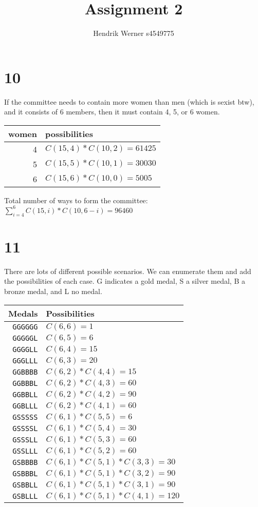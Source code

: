 \documentclass[12pt]{article}
\title{Assignment 2}
\author{
	Hendrik Werner s4549775
}
\begin{document}
\maketitle

\section*{10}
If the committee needs to contain more women than men (which is sexist btw), and it consists of 6 members, then it must contain 4, 5, or 6 women.

\begin{tabular}{r|l}
	women & possibilities\\\hline
	4 & $C(15, 4) * C(10, 2) = 61425$\\
	5 & $C(15, 5) * C(10, 1) = 30030$\\
	6 & $C(15, 6) * C(10, 0) = 5005$
\end{tabular}

Total number of ways to form the committee: $\sum_{i=4}^{6} C(15, i) * C(10, 6 - i) = 96460$

\section*{11}
There are lots of different possible scenarios. We can enumerate them and add the possibilities of each case. G indicates a gold medal, S a silver medal, B a bronze medal, and L no medal.

\begin{tabular}{r|l}
	Medals & Possibilities\\\hline
	\texttt{GGGGGG} & $C(6, 6) = 1$\\
	\texttt{GGGGGL} & $C(6, 5) = 6$\\
	\texttt{GGGGLL} & $C(6, 4) = 15$\\
	\texttt{GGGLLL} & $C(6, 3) = 20$\\
	\texttt{GGBBBB} & $C(6, 2) * C(4, 4) = 15$\\
	\texttt{GGBBBL} & $C(6, 2) * C(4, 3) = 60$\\
	\texttt{GGBBLL} & $C(6, 2) * C(4, 2) = 90$\\
	\texttt{GGBLLL} & $C(6, 2) * C(4, 1) = 60$\\
	\texttt{GSSSSS} & $C(6, 1) * C(5, 5) = 6$\\
	\texttt{GSSSSL} & $C(6, 1) * C(5, 4) = 30$\\
	\texttt{GSSSLL} & $C(6, 1) * C(5, 3) = 60$\\
	\texttt{GSSLLL} & $C(6, 1) * C(5, 2) = 60$\\
	\texttt{GSBBBB} & $C(6, 1) * C(5, 1) * C(3, 3) = 30$\\
	\texttt{GSBBBL} & $C(6, 1) * C(5, 1) * C(3, 2) = 90$\\
	\texttt{GSBBLL} & $C(6, 1) * C(5, 1) * C(3, 1) = 90$\\
	\texttt{GSBLLL} & $C(6, 1) * C(5, 1) * C(4, 1) = 120$\\
\end{tabular}
\end{document}
